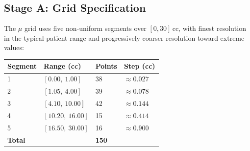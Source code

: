 \documentclass[11pt]{article}
\begin{document}
\subsection{Stage A: Grid Specification}

The $\mu$ grid uses five non-uniform segments over $[0, 30]$\,cc, with finest resolution in the typical-patient range and progressively coarser resolution toward extreme values:
\begin{center}
\small
\begin{tabular}{llll}
\hline
\textbf{Segment} & \textbf{Range (cc)} & \textbf{Points} & \textbf{Step (cc)} \\
\hline
1 & $[0.00,\ 1.00]$  & 38 & $\approx 0.027$ \\
2 & $[1.05,\ 4.00]$  & 39 & $\approx 0.078$ \\
3 & $[4.10,\ 10.00]$ & 42 & $\approx 0.144$ \\
4 & $[10.20,\ 16.00]$ & 15 & $\approx 0.414$ \\
5 & $[16.50,\ 30.00]$ & 16 & $\approx 0.900$ \\
\hline
\multicolumn{2}{l}{\textbf{Total}} & \textbf{150} & \\
\hline
\end{tabular}
\normalsize
\end{center}
\end{document}
